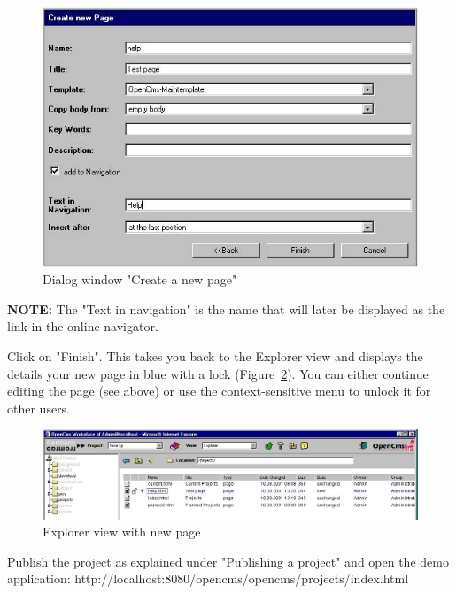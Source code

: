 \begin{figure}[hbt]
\begin{center}
\includegraphics[width=\sgw]
                   {pics/usermanual/newPage02}
\caption[Dialog window "Create a new page"]
           {Dialog window "Create a new page"}
\label{newpage02}
\end{center}
\end{figure}

\textbf{NOTE:} The "Text in navigation" is the name that will
later be displayed as the link in the online navigator.

Click on "Finish". This takes you back to the Explorer view and
displays the details your new page in blue with a lock
(Figure~\ref{explnewpage}). You can either continue editing the
page (see above) or use the context-sensitive menu to unlock it
for other users.

\begin{figure}[hbt]
\begin{center}
\includegraphics[width=\sgw]
                   {pics/usermanual/explNewPage}
\caption[Explorer view with new page]
           {Explorer view with new page}
\label{explnewpage}
\end{center}
\end{figure}

Publish the project as explained under "Publishing a project" and
open the demo application:
http://localhost:8080/opencms/opencms/projects/index.html

